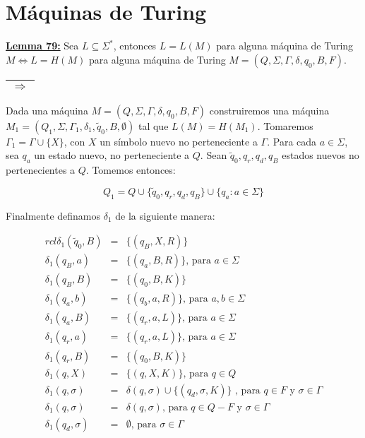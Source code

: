 \section{Máquinas de Turing}

  \textbf{\underline{Lemma 79:}} Sea $L \subseteq \Sigma^{\ast }$, entonces $L = L(M)$ para alguna máquina de Turing
    $M \Leftrightarrow L = H(M)$ para alguna máquina de Turing $M = (Q, \Sigma, \Gamma, \delta, q_{0}, B, F)$.

  \PROOF \begin{tabular}{|c|}\hline $\Rightarrow$\\\hline\end{tabular} Dada una máquina $M = (Q, \Sigma, \Gamma,
    \delta, q_{0}, B, F)$ construiremos una máquina $M_{1} = (Q_{1}, \Sigma, \Gamma_{1}, \delta_{1}, \tilde{q}_{0}, B,
    \emptyset)$ tal que $L(M) = H(M_{1}).$ Tomaremos $\Gamma_{1} = \Gamma \cup \{X\}$, con $X$ un símbolo nuevo no
    perteneciente a $\Gamma$. Para cada $a \in \Sigma$, sea $q_{a}$ un estado nuevo, no perteneciente a $Q$. Sean
    $\tilde {q}_{0}, q_{r}, q_{d}, q_{B}$ estados nuevos no pertenecientes a $Q$. Tomemos entonces:

    \[
      Q_{1} = Q \cup \{\tilde{q}_{0}, q_{r}, q_{d}, q_{B}\}\cup \{q_{a}: a \in \Sigma \}
    \]

    \par Finalmente definamos $\delta_{1}$ de la siguiente manera:

    \begin{eqnarray}{rcl}
      \nonumber \delta_{1}(\tilde{q}_{0}, B) &=& \{(q_{B}, X, R)\} \\
      \nonumber \delta_{1}(q_{B}, a) &=& \{(q_{a}, B, R)\} \text{, para } a \in \Sigma \\
      \nonumber \delta_{1}(q_{B}, B) &=& \{(q_{0}, B, K)\} \\
      \nonumber \delta_{1}(q_{a}, b) &=& \{(q_{b}, a, R)\} \text{, para } a, b \in \Sigma \\
      \nonumber \delta_{1}(q_{a}, B) &=& \{(q_{r}, a, L)\} \text{, para } a \in \Sigma \\
      \nonumber \delta_{1}(q_{r}, a) &=& \{(q_{r}, a, L)\} \text{, para } a \in \Sigma \\
      \nonumber \delta_{1}(q_{r}, B) &=& \{(q_{0}, B, K)\} \\
      \nonumber \delta _{1}(q, X) &=& \{(q, X, K)\} \text{, para } q \in Q \\
      \nonumber \delta_{1}(q, \sigma) &=& \delta (q, \sigma) \cup \{(q_{d}, \sigma, K)\} \text{ , para } q \in F
      \text{ y } \sigma \in \Gamma \\
      \nonumber \delta_{1}(q, \sigma) &=& \delta (q, \sigma) \text{, para } q \in Q-F \text{ y } \sigma \in \Gamma \\
      \nonumber \delta_{1}(q_{d}, \sigma) &=& \emptyset \text{, para } \sigma \in \Gamma
    \end{eqnarray}

